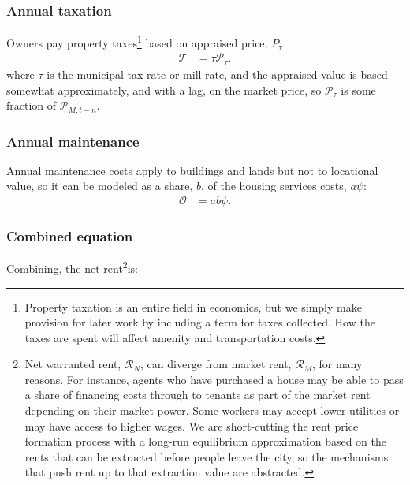 \subsubsection{Annual taxation}
Owners pay property taxes\footnote{Property taxation is an entire field in economics, but we simply make provision for later work by including a term for taxes collected. How the taxes are spent will affect amenity and transportation costs.} based on appraised price, $P_{\tau}$
\begin{align*}
\mathcal{T} &= \tau  \mathcal{P}_{\tau}.
\end{align*}
where $\tau$ is the municipal tax rate or \gls{mill rate}, and the \gls{appraised value} is based somewhat approximately, and with a lag, on the \gls{market price}, so $\mathcal{P}_{\tau}$ is some fraction of $\mathcal{P}_{M, t-n}$.



\subsubsection{Annual maintenance}
Annual maintenance costs apply to buildings and lands but not to locational value, so it can be modeled as a share, $b$, of the housing services costs, $a \psi$: 
\begin{align}
\mathcal{O} &= a b \psi.
\end{align}

\subsubsection{Combined equation}
Combining, the \gls{net rent}\footnote{Net warranted rent, $\mathcal{R}_N$, can diverge from market rent, $\mathcal{R}_M$, for many reasons. For instance, agents who have purchased a house may be able to pass a share of financing costs through to tenants as part of the market rent depending on their market power. Some workers may accept lower utilities or may have access to higher wages. %
We are short-cutting the rent price formation process with a long-run equilibrium approximation based on the rents that can be extracted before people leave the city, so the mechanisms that push rent up to that extraction value are abstracted. %
% 
}is:

